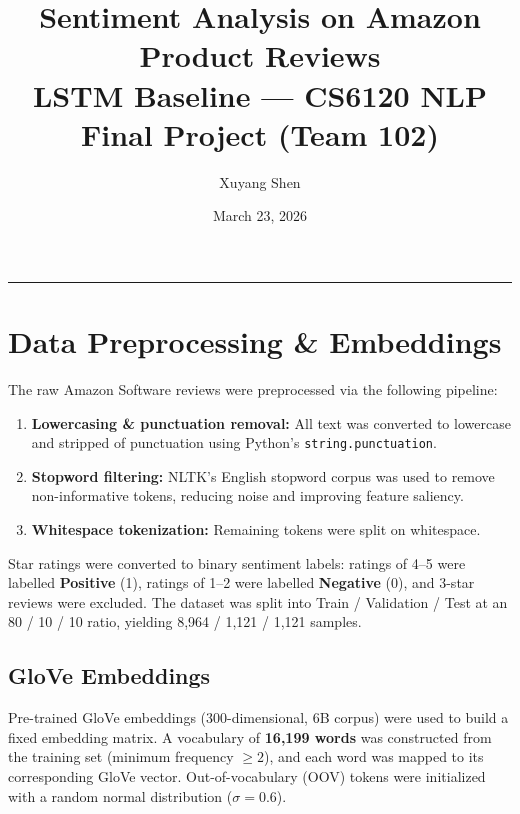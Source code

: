 \documentclass[11pt, a4paper]{article}
\title{\textbf{Sentiment Analysis on Amazon Product Reviews}\\
       \large LSTM Baseline --- CS6120 NLP Final Project (Team 102)}
\author{Xuyang Shen}
\date{March 23, 2026}
\begin{document}
\maketitle
\tableofcontents
\vspace{1em}
\hrule
\vspace{1em}

\section{Data Preprocessing \& Embeddings}

The raw Amazon Software reviews were preprocessed via the following pipeline:

\begin{enumerate}
    \item \textbf{Lowercasing \& punctuation removal:} All text was converted to lowercase and stripped of punctuation using Python's \texttt{string.punctuation}.
    \item \textbf{Stopword filtering:} NLTK's English stopword corpus was used to remove non-informative tokens, reducing noise and improving feature saliency.
    \item \textbf{Whitespace tokenization:} Remaining tokens were split on whitespace.
\end{enumerate}

Star ratings were converted to binary sentiment labels: ratings of 4--5 were labelled \textbf{Positive} (1), ratings of 1--2 were labelled \textbf{Negative} (0), and 3-star reviews were excluded. The dataset was split into Train / Validation / Test at an 80 / 10 / 10 ratio, yielding 8,964 / 1,121 / 1,121 samples.

\subsection*{GloVe Embeddings}

Pre-trained GloVe embeddings (300-dimensional, 6B corpus) were used to build a fixed embedding matrix. A vocabulary of \textbf{16,199 words} was constructed from the training set (minimum frequency $\geq 2$), and each word was mapped to its corresponding GloVe vector. Out-of-vocabulary (OOV) tokens were initialized with a random normal distribution ($\sigma = 0.6$).

\end{document}
